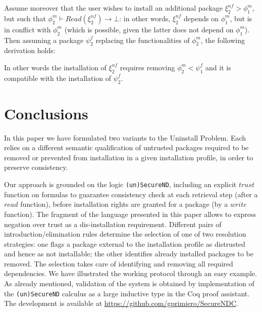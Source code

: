 \documentclass[]{llncs}
\begin{document}
Assume moreover that the user wishes to install an additional package $\xi^{nf}_{2}>\phi^{m}_{1}$, but such that  $\phi^{m}_{2}\vdash Read(\xi^{nf}_{2})\rightarrow \bot$: in other words, $\xi^{nf}_{2}$ depends on $\phi^{m}_{1}$, but is in conflict with $\phi^{m}_{2}$ (which is possible, given the latter does not depend on $\phi^{m}_{1}$). Then assuming a package $\psi^{f}_{2}$ replacing the functionalities of $\phi^{m}_{2}$,  the following derivation holds:



\begin{prooftree}


	\end{prooftree}
In other words the installation of $\xi^{nf}_{2}$ requires removing $\phi^{m}_{2}<\psi^{f}_{1}$ and it is compatible with the installation of $\psi^{f}_{2}$.



\section{Conclusions}

In this paper we have formulated two variants to the Uninstall Problem. Each relies on a different semantic qualification of untrusted packages required to be removed or prevented from installation in a given installation profile, in order to preserve consistency.

Our approach is grounded on the logic \texttt{(un)SecureND}, including an explicit $trust$ function on formulas to guarantee consistency check at each retrieval step (after a $read$ function), before installation rights are granted for a package (by a $write$ function). The fragment of the language presented in this paper allows to express negation over trust as a dis-installation requirement. Different pairs of introduction/elimination rules determine the selection of one of two resolution strategies: one flags a package external to the installation profile as distrusted and hence as not installable; the other identifies already installed packages to be removed. The selection takes care of identifying and removing all required dependencies. We have illustrated the working protocol through an easy example. As already mentioned, validation of the system is obtained by implementation of the \texttt{(un)SecureND} calculus as a large inductive type in the Coq proof assistant. The development is available at \url{https://github.com/gprimiero/SecureNDC}.
\end{document}
